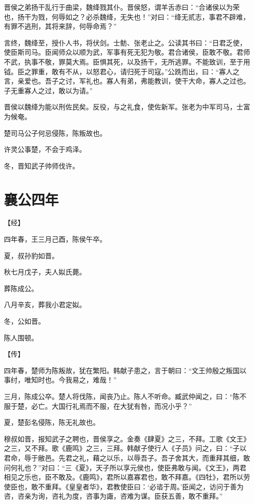 \documentclass[a4paper,12pt,UTF8,twoside]{ctexbook}
\begin{document}
晋侯之弟扬干乱行于曲梁，魏绛戮其仆。晋侯怒，谓羊舌赤曰：“合诸侯以为荣也，扬干为戮，何辱如之？必杀魏绛，无失也！”对曰：“绛无贰志，事君不辟难，有罪不逃刑，其将来辞，何辱命焉？”

言终，魏绛至，授仆人书，将伏剑。士鲂、张老止之。公读其书曰：“日君乏使，使臣斯司马。臣闻师众以顺为武，军事有死无犯为敬。君合诸侯，臣敢不敬。君师不武，执事不敬，罪莫大焉。臣惧其死，以及扬干，无所逃罪。不能致训，至于用钺。臣之罪重，敢有不从，以怒君心，请归死于司寇。”公跣而出，曰：“寡人之言，亲爱也。吾子之讨，军礼也。寡人有弟，弗能教训，使干大命，寡人之过也。子无重寡人之过，敢以为请。”

晋侯以魏绛为能以刑佐民矣。反役，与之礼食，使佐新军。张老为中军司马，士富为候奄。

楚司马公子何忌侵陈，陈叛故也。

许灵公事楚，不会于鸡泽。

冬，晋知武子帅师伐许。


\section{襄公四年}


【经】

四年春，王三月己酉，陈侯午卒。

夏，叔孙豹如晋。

秋七月戊子，夫人姒氏薨。

葬陈成公。

八月辛亥，葬我小君定姒。

冬，公如晋。

陈人围顿。

【传】

四年春，楚师为陈叛故，犹在繁阳。韩献子患之，言于朝曰：“文王帅殷之叛国以事纣，唯知时也。今我易之，难哉！”

三月，陈成公卒。楚人将伐陈，闻丧乃止。陈人不听命。臧武仲闻之，曰：“陈不服于楚，必亡。大国行礼焉而不服，在大犹有咎，而况小乎？”

夏，楚彭名侵陈，陈无礼故也。

穆叔如晋，报知武子之聘也，晋侯享之。金奏《肆夏》之三，不拜。工歌《文王》之三，又不拜。歌《鹿鸣》之三，三拜。韩献子使行人《子员》问之，曰：“子以君命，辱于敝邑。先君之礼，藉之以乐，以辱吾子。吾子舍其大，而重拜其细，敢问何礼也？”对曰：“三《夏》，天子所以享元侯也，使臣弗敢与闻。《文王》，两君相见之乐也，臣不敢及。《鹿鸣》，君所以嘉寡君也，敢不拜嘉。《四牡》，君所以劳使臣也，敢不重拜。《皇皇者华》，君教使臣曰：‘必谘于周。’臣闻之，访问于善为咨，咨亲为询，咨礼为度，咨事为諏，咨难为谋。臣获五善，敢不重拜。”
\end{document}
